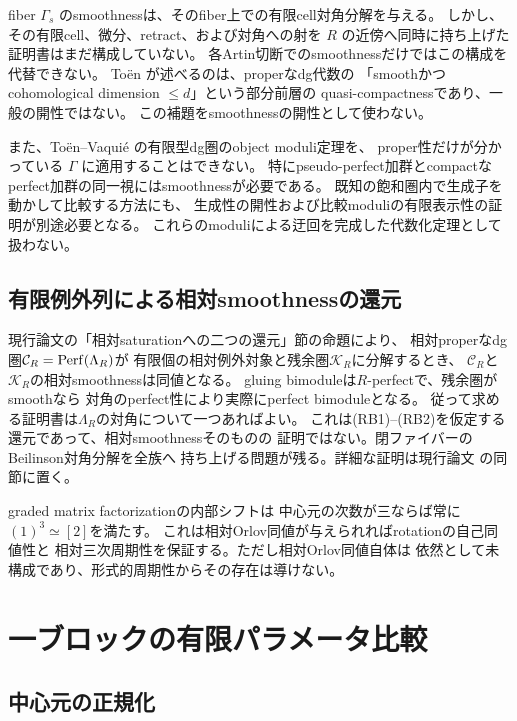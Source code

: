 \begin{remark}[現時点で未解決の点]\label{rem:relative-saturation-gap}
 fiber \(\Gamma_s\) のsmoothnessは、そのfiber上での有限cell対角分解を与える。
 しかし、その有限cell、微分、retract、および対角への射を
 \(R\) の近傍へ同時に持ち上げた証明書はまだ構成していない。
 各Artin切断でのsmoothnessだけではこの構成を代替できない。
 Toën \cite[Lemma 3.14]{ToenFinitude} が述べるのは、properなdg代数の
 「smoothかつcohomological dimension \(\le d\)」という部分前層の
 quasi-compactnessであり、一般の開性ではない。
 この補題をsmoothnessの開性として使わない。

 また、Toën--Vaquié \cite[Theorem 3.6]{TV} の有限型dg圏のobject moduli定理を、
 proper性だけが分かっている \(\Gamma\) に適用することはできない。
 特にpseudo-perfect加群とcompactなperfect加群の同一視にはsmoothnessが必要である。
 既知の飽和圏内で生成子を動かして比較する方法にも、
 生成性の開性および比較moduliの有限表示性の証明が別途必要となる。
 これらのmoduliによる迂回を完成した代数化定理として扱わない。
\end{remark}


\subsection{有限例外列による相対smoothnessの還元}
現行論文の「相対saturationへの二つの還元」節の命題により、
相対properなdg圏$\mathcal C_R=\operatorname{Perf}(\Lambda_R)$が
有限個の相対例外対象と残余圏$\mathcal K_R$に分解するとき、
$\mathcal C_R$と$\mathcal K_R$の相対smoothnessは同値となる。
gluing bimoduleは$R$-perfectで、残余圏がsmoothなら
対角のperfect性により実際にperfect bimoduleとなる。
従って求める証明書は$\Lambda_R$の対角について一つあればよい。
これは(RB1)--(RB2)を仮定する還元であって、相対smoothnessそのものの
証明ではない。閉ファイバーのBeilinson対角分解を全族へ
持ち上げる問題が残る。詳細な証明は現行論文
の同節に置く。

graded matrix factorizationの内部シフトは
中心元の次数が三ならば常に$(1)^3\simeq[2]$を満たす。
これは相対Orlov同値が与えられればrotationの自己同値性と
相対三次周期性を保証する。ただし相対Orlov同値自体は
依然として未構成であり、形式的周期性からその存在は導けない。

\section{一ブロックの有限パラメータ比較}

\subsection{中心元の正規化}

